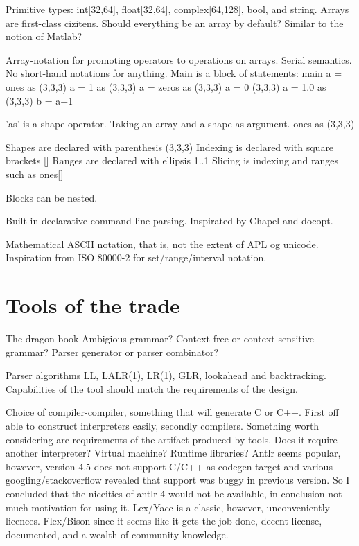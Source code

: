 \documentclass{sigplanconf}
\begin{document}
Primitive types: int[32,64], float[32,64], complex[64,128], bool, and string.
Arrays are first-class cizitens. Should everything be an array by default? Similar to the notion of Matlab?

Array-notation for promoting operators to operations on arrays.
Serial semantics.
No short-hand notations for anything.
Main is a block of statements:
main {
    a = ones as (3,3,3)
    a = 1 as (3,3,3)
    a = zeros as (3,3,3)
    a = 0 (3,3,3)
    a = 1.0 as (3,3,3)
    b = a+1
}

'as' is a shape operator. Taking an array and a shape as argument.
ones as (3,3,3)

Shapes are declared with parenthesis (3,3,3)
Indexing is declared with square brackets []
Ranges are declared with ellipsis 1..1
Slicing is indexing and ranges such as ones[]

Blocks can be nested.

Built-in declarative command-line parsing. Inspirated by Chapel and docopt.

Mathematical ASCII notation, that is, not the extent of APL og unicode.
Inspiration from ISO 80000-2 for set/range/interval notation.

\section{Tools of the trade}

The dragon book
Ambigious grammar?
Context free or context sensitive grammar?
Parser generator or parser combinator?

Parser algorithms LL, LALR(1), LR(1), GLR, lookahead and backtracking.
Capabilities of the tool should match the requirements of the design.

Choice of compiler-compiler, something that will generate C or C++. First off able to construct interpreters easily, secondly compilers. Something worth considering are requirements of the artifact produced by tools. Does it require another interpreter? Virtual machine? Runtime libraries?  Antlr\cite{cc:antlr} seems popular, however, version 4.5 does not support C/C++ as codegen target and various googling/stackoverflow revealed that support was buggy in previous version. So I concluded that the niceities of antlr 4 would not be available, in conclusion not much motivation for using it. Lex\cite{cc:lex}/Yacc\cite{cc:yacc} is a classic, however, unconveniently licences. Flex/Bison since it seems like it gets the job done, decent license, documented, and a wealth of community knowledge.
\end{document}
